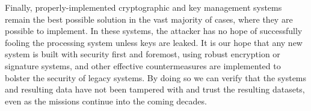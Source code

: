 Finally, properly-implemented cryptographic and key management systems remain the best possible solution in the vast majority of cases, where they are possible to implement.
In these systems, the attacker has no hope of successfully fooling the processing system unless keys are leaked.
It is our hope that any new system is built with security first and foremost, using robust encryption or signature systems, and other effective countermeasures are implemented to bolster the security of legacy systems.
By doing so we can verify that the systems and resulting data have not been tampered with and trust the resulting datasets, even as the missions continue into the coming decades.
